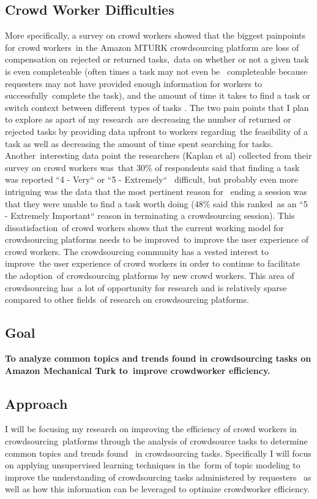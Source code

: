 \documentclass[letterpaper,12pt]{article}
\begin{document}
\subsection{Crowd Worker Difficulties}
More specifically, a survey on crowd workers showed that the biggest painpoints for crowd workers\
in the Amazon MTURK crowdsourcing platform are loss of compensation on rejected or returned tasks,\
data on whether or not a given task is even completeable (often times a task may not even be \
completeable because requesters may not have provided enough information for workers to successfully\
complete the task), and the amount of time it takes to find a task or switch context between different\
types of tasks \cite{Kaplan2018}. The two pain points that I plan to explore as apart of my research\
are decreasing the number of returned or rejected tasks by providing data upfront to workers regarding\
the feasibility of a task as well as decreasing the amount of time spent searching for tasks. Another\
interesting data point the researchers (Kaplan et al) collected from their survey on crowd workers was\
that 30\% of respondents said that finding a task was reported ``4 - Very`` or ``5 - Extremely`` \
difficult, but probably even more intriguing was the data that the most pertinent reason for \
ending a session was that they were unable to find a task worth doing (48\% said this ranked\
as an ``5 - Extremely Important`` reason in terminating a crowdsourcing session). \cite{Kaplan2018} This dissatisfaction\
of crowd workers shows that the current working model for crowdsourcing platforms needs to be improved\
to improve the user experience of crowd workers. The crowdsourcing community has a vested interest to improve\
the user experience of crowd workers in order to continue to facilitate the adoption\
of crowdsourcing platforms by new crowd workers. This area of crowdsourcing has\
a lot of opportunity for research and is relatively sparse compared to other fields\
of research on crowdsourcing platforms.

\subsection{Goal}
\textbf{To analyze common topics and trends found in crowdsourcing tasks on Amazon Mechanical Turk to\
 improve crowdworker efficiency.}

\subsection{Approach}
I will be focusing my research on improving the efficiency of crowd workers in crowdsourcing\
platforms through the analysis of crowdsource tasks to determine common topics and trends found \
in crowdsourcing tasks. Specifically I will focus on applying unsupervised learning techniques in the\
form of topic modeling to improve the understanding of crowdsourcing tasks administered by requesters \ 
as well as how this information can be leveraged to optimize crowdworker efficiency. 
\end{document}
